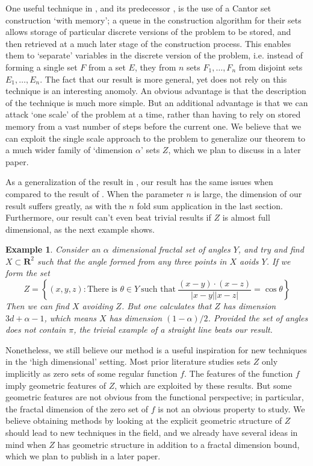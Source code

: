 \documentclass[usenames,dvipsnames]{article}
\theoremstyle{plain}
\newtheorem*{example}{Example}
\theoremstyle{plain}
\begin{document}
One useful technique in \cite{MalabikaRob}, and its predecessor \cite{KeletiDimOneSet}, is the use of a Cantor set construction `with memory'; a queue in the construction algorithm for their sets allows storage of particular discrete versions of the problem to be stored, and then retrieved at a much later stage of the construction process. This enables them to `separate' variables in the discrete version of the problem, i.e. instead of forming a single set $F$ from a set $E$, they from $n$ sets $F_1, \dots, F_n$ from disjoint sets $E_1, \dots, E_n$. The fact that our result is more general, yet does not rely on this technique is an interesting anomoly. An obvious advantage is that the description of the technique is much more simple. But an additional advantage is that we can attack `one scale' of the problem at a time, rather than having to rely on stored memory from a vast number of steps before the current one. We believe that we can exploit the single scale approach to the problem to generalize our theorem to a much wider family of `dimension $\alpha$' sets $Z$, which we plan to discuss in a later paper.

As a generalization of the result in \cite{MalabikaRob}, our result has the same issues when compared to the result of \cite{Mathe}. When the parameter $n$ is large, the dimension of our result suffers greatly, as with the $n$ fold sum application in the last section. Furthermore, our result can't even beat trivial results if $Z$ is almost full dimensional, as the next example shows.

\begin{example}
	Consider an $\alpha$ dimensional fractal set of angles $Y$, and try and find $X \subset \mathbf{R}^2$ such that the angle formed from any three points in $X$ aoids $Y$. If we form the set
	\[ Z = \left\{ (x,y,z): \text{There is $\theta \in Y$}\ \text{such that}\ \frac{(x - y) \cdot (x - z)}{|x - y||x - z|} = \cos \theta \right\} \]
	Then we can find $X$ avoiding $Z$. But one calculates that $Z$ has dimension $3d + \alpha - 1$, which means $X$ has dimension $(1 - \alpha) / 2$. Provided the set of angles does not contain $\pi$, the trivial example of a straight line beats our result.
\end{example}

Nonetheless, we still believe our method is a useful inspiration for new techniques in the `high dimensional' setting. Most prior literature studies sets $Z$ only implicitly as zero sets of some regular function $f$. The features of the function $f$ imply geometric features of $Z$, which are exploited by these results. But some geometric features are not obvious from the functional perspective; in particular, the fractal dimension of the zero set of $f$ is not an obvious property to study. We believe obtaining methods by looking at the explicit geometric structure of $Z$ should lead to new techniques in the field, and we already have several ideas in mind when $Z$ has geometric structure in addition to a fractal dimension bound, which we plan to publish in a later paper.
\end{document}
